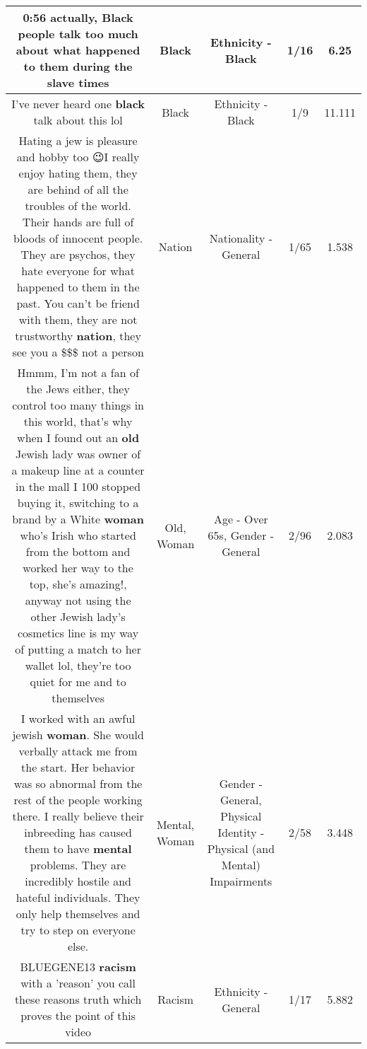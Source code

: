 \documentclass[11pt]{article}
\newlength\mylength
\begin{document}
\begin{center}
\begin{longtable}{|C{.65\mylength}|C{.30\mylength}|C{.12\mylength}|C{.12\mylength}|C{.12\mylength}|}
  \small 0:56 actually, \textbf{Black} people talk too much about what happened to them during the slave times\normalsize   & Black & Ethnicity - Black & 1/16 & 6.25 \\  \hline
  \small I've never heard one \textbf{black} talk about this lol\normalsize   & Black & Ethnicity - Black & 1/9 & 11.111 \\  \hline
  \small Hating a jew is pleasure and hobby too 😉I really enjoy hating them, they are behind of all the troubles of the world.  Their hands are full of bloods of innocent people. They are psychos, they hate everyone for what happened to them in the past. You can't be friend with them, they are not trustworthy \textbf{nation}, they see you a \$\$\$ not a person\normalsize   & Nation & Nationality - General & 1/65 & 1.538 \\  \hline
  \small Hmmm, I'm not a fan of the Jews either, they control too many things in this world, that's why when I found out an \textbf{old} Jewish lady was owner of a makeup line at a counter in the mall I 100 stopped buying it, switching to a brand by a White \textbf{woman} who's Irish who started from the bottom and worked her way to the top, she's amazing!, anyway not using the other Jewish lady's cosmetics line is my way of putting a match to her wallet lol, they're too quiet for me and to themselves\normalsize   & Old, Woman & Age - Over 65s, Gender - General & 2/96 & 2.083 \\  \hline
  \small I worked with an awful jewish \textbf{woman}. She would verbally attack me from the start. Her behavior was so abnormal from the rest of the people working there. I really believe their inbreeding has caused them to have \textbf{mental} problems. They are incredibly hostile and hateful individuals. They only help themselves and try to step on everyone else.\normalsize   & Mental, Woman & Gender - General, Physical Identity - Physical (and Mental) Impairments & 2/58 & 3.448 \\  \hline
  \small BLUEGENE13 \textbf{racism} with a 'reason' you call these reasons truth which proves the point of this video\normalsize   & Racism & Ethnicity - General & 1/17 & 5.882 \\  \hline

\end{longtable}
\end{center}
\end{document}
